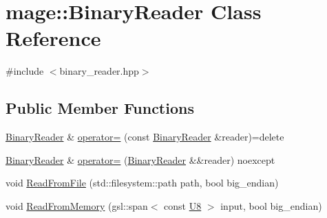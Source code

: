 \hypertarget{classmage_1_1_binary_reader}{}\section{mage\+:\+:Binary\+Reader Class Reference}
\label{classmage_1_1_binary_reader}


{\ttfamily \#include $<$binary\+\_\+reader.\+hpp$>$}

\subsection*{Public Member Functions}
\begin{DoxyCompactItemize}
\item 
\mbox{\hyperlink{classmage_1_1_binary_reader}{Binary\+Reader}} \& \mbox{\hyperlink{classmage_1_1_binary_reader_a0408bb456983b4a03ae42ab69c6f4bc3}{operator=}} (const \mbox{\hyperlink{classmage_1_1_binary_reader}{Binary\+Reader}} \&reader)=delete
\item 
\mbox{\hyperlink{classmage_1_1_binary_reader}{Binary\+Reader}} \& \mbox{\hyperlink{classmage_1_1_binary_reader_a280998bb89dacdcb88ec87c49ce90a02}{operator=}} (\mbox{\hyperlink{classmage_1_1_binary_reader}{Binary\+Reader}} \&\&reader) noexcept
\item 
void \mbox{\hyperlink{classmage_1_1_binary_reader_a38daa2eb250146c537bbc65044a5738f}{Read\+From\+File}} (std\+::filesystem\+::path path, bool big\+\_\+endian)
\item 
void \mbox{\hyperlink{classmage_1_1_binary_reader_a093d95a36bdc45f5d51f48f1ee09bb1f}{Read\+From\+Memory}} (gsl\+::span$<$ const \mbox{\hyperlink{namespacemage_afc638980bc6154f15af5e2d93a0e0ea9}{U8}} $>$ input, bool big\+\_\+endian)
\end{DoxyCompactItemize}
